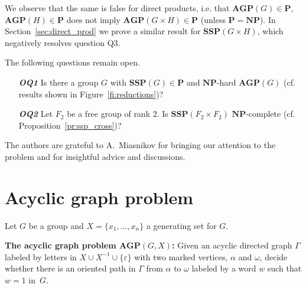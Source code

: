 \documentclass[10pt]{amsart}
\theoremstyle{definition}
\def\P{{\mathbf{P}}}
\def\NP{{\mathbf{NP}}}
\def\SSP{{\mathbf{SSP}}}
\def\AGP{{\mathbf{AGP}}}
\begin{document}
We observe that the same is false for direct products, i.e. that $\AGP(G)\in\P$, $\AGP(H)\in\P$ does not imply $\AGP(G\times H)\in\P$ (unless $\P=\NP$). In Section~\ref{sec:direct_prod}
we prove a similar result for $\SSP(G\times H)$, which negatively resolves question Q3.


The following questions remain open.
\begin{itemize}
\item[{\textbf{\textit{OQ1}}}] Is there a group $G$ with $\SSP(G)\in\P$ and $\NP$-hard $\AGP(G)$ (cf. results shown in Figure~\ref{fi:reductions})?
\item[{\textbf{\textit{OQ2}}}] Let $F_2$ be a free group of rank $2$. Is $\SSP(F_2\times F_2)$ $\NP$-complete (cf. Proposition~\ref{pr:ssp_cross})?
\end{itemize}

The authors are grateful to A.~Miasnikov for bringing our attention to the problem and for insightful advice and discussions.



\section{Acyclic graph problem}\label{sec:agp}
Let $G$ be a group and $X=\{x_1,\ldots,x_n\}$ a generating set for $G$.

%

\medskip
\noindent
{\bf The acyclic graph problem $\AGP(G,X)$\index{$\AGP(G,X)$}:}
Given an acyclic directed graph $\Gamma$ labeled by letters in $X\cup X^{-1}\cup \{\varepsilon\}$ with two marked vertices, $\alpha$ and $\omega$, decide whether there is an oriented path in $\Gamma$ from $\alpha$ to $\omega$ labeled by a word $w$ such that $w=1$ in~$G$.
\end{document}
